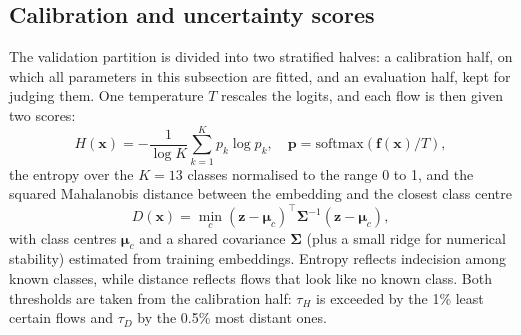 \documentclass[conference]{IEEEtran}
\begin{document}
\subsection{Calibration and uncertainty scores}
The validation partition is divided into two stratified halves: a calibration half, on which all
parameters in this subsection are fitted, and an evaluation half, kept for judging them. One
temperature $T$ \cite{guo2017calibration} rescales the logits, and each flow is then given two
scores:
\begin{equation}
H(\mathbf{x}) = -\frac{1}{\log K}\sum_{k=1}^{K} p_k \log p_k, \quad
\mathbf{p} = \mathrm{softmax}(\mathbf{f}(\mathbf{x})/T),
\end{equation}
the entropy over the $K=13$ classes normalised to the range 0 to 1, and the squared Mahalanobis
distance between the embedding and the closest class centre \cite{lee2018simple}
\begin{equation}
D(\mathbf{x}) = \min_{c} (\mathbf{z}-\boldsymbol{\mu}_c)^\top \boldsymbol{\Sigma}^{-1} (\mathbf{z}-\boldsymbol{\mu}_c),
\end{equation}
with class centres $\boldsymbol{\mu}_c$ and a shared covariance $\boldsymbol{\Sigma}$ (plus a small
ridge for numerical stability) estimated from training embeddings. Entropy reflects indecision
among known classes, while distance reflects flows that look like no known class. Both thresholds
are taken from the calibration half: $\tau_H$ is exceeded by the 1\% least certain flows and $\tau_D$
by the 0.5\% most distant ones.
\end{document}
